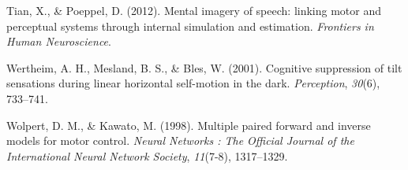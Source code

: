 \documentclass[english,floatsintext,man]{apa6}
\theoremstyle{definition}
\theoremstyle{definition}
\theoremstyle{remark}
\begin{document}
\hypertarget{ref-Tian:2012ui}{}
Tian, X., \& Poeppel, D. (2012). Mental imagery of speech: linking motor
and perceptual systems through internal simulation and estimation.
\emph{Frontiers in Human Neuroscience}.

\hypertarget{ref-Wertheim:2001cb}{}
Wertheim, A. H., Mesland, B. S., \& Bles, W. (2001). Cognitive
suppression of tilt sensations during linear horizontal self-motion in
the dark. \emph{Perception}, \emph{30}(6), 733--741.

\hypertarget{ref-Wolpert:1998td}{}
Wolpert, D. M., \& Kawato, M. (1998). Multiple paired forward and
inverse models for motor control. \emph{Neural Networks : The Official
Journal of the International Neural Network Society}, \emph{11}(7-8),
1317--1329.


\clearpage
\renewcommand{\listtablename}{Table captions}
\listoftables

\clearpage
\renewcommand{\listfigurename}{Figure captions}
\listoffigures
\end{document}
